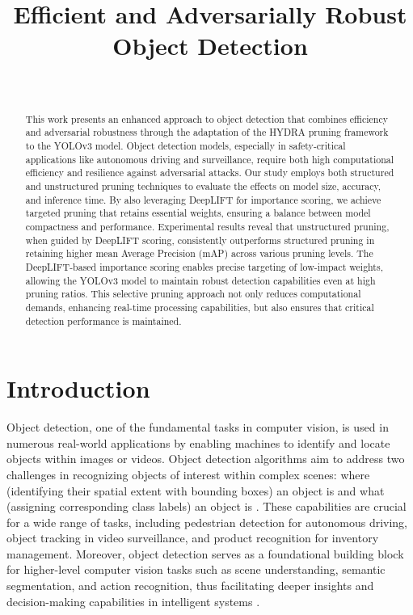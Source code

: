 \documentclass[journal,onecolumn,12pt]{IEEEtran}
\begin{document}
\title{Efficient and Adversarially Robust Object Detection}
\author{
 \\
}

\maketitle

\begin{abstract}
This work presents an enhanced approach to object detection that combines efficiency and adversarial robustness through the adaptation of the HYDRA pruning framework to the YOLOv3 model. Object detection models, especially in safety-critical applications like autonomous driving and surveillance, require both high computational efficiency and resilience against adversarial attacks. Our study employs both structured and unstructured pruning techniques to evaluate the effects on model size, accuracy, and inference time. By also leveraging DeepLIFT for importance scoring, we achieve targeted pruning that retains essential weights, ensuring a balance between model compactness and performance. Experimental results reveal that unstructured pruning, when guided by DeepLIFT scoring, consistently outperforms structured pruning in retaining higher mean Average Precision (mAP) across various pruning levels. The DeepLIFT-based importance scoring enables precise targeting of low-impact weights, allowing the YOLOv3 model to maintain robust detection capabilities even at high pruning ratios. This selective pruning approach not only reduces computational demands, enhancing real-time processing capabilities, but also ensures that critical detection performance is maintained.
\end{abstract}


\section{Introduction}

Object detection, one of the fundamental tasks in computer vision, is used in numerous real-world applications by enabling machines to identify and locate objects within images or videos. Object detection algorithms aim to address two challenges in recognizing objects of interest within complex scenes: where (identifying their spatial extent with bounding boxes) an object is and what (assigning corresponding class labels) an object is \cite{zhao2019objectdetectiondeeplearning}. These capabilities are crucial for a wide range of tasks, including pedestrian detection for autonomous driving, object tracking in video surveillance, and product recognition for inventory management. Moreover, object detection serves as a foundational building block for higher-level computer vision tasks such as scene understanding, semantic segmentation, and action recognition, thus facilitating deeper insights and decision-making capabilities in intelligent systems \cite{10028728}.
\end{document}
